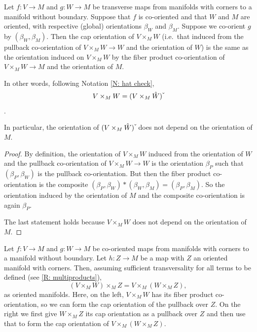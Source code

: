 \begin{lemma}\label{L: same induced}
	Let $f \colon V \to M$ and $g \colon W \to M$ be transverse maps from manifolds with corners to a manifold without boundary.
	Suppose that $f$ is co-oriented and that $W$ and $M$ are oriented, with respective (global) orientations $\beta_W$ and $\beta_M$.
	Suppose we co-orient $g$ by $(\beta_W,\beta_M)$.
	Then the cap orientation of $V \times_M W$ (i.e.\ that induced from the pullback co-orientation of $V \times_M W \to W$ and the orientation of $W$) is the same as the orientation induced on $V \times_M W$ by the fiber product co-orientation of $V \times_M W \to M$ and the orientation of $M$.

	In other words, following Notation \ref{N: hat check},
	\[
	V \times_M W = (V \times_M \hat W)\,\check{\vrule height1.3ex width0pt}
	\].

	In particular, the orientation of $(V \times_M \hat W)\,\check{\vrule height1.3ex width0pt}$ does not depend on the orientation of $M$.
\end{lemma}

\begin{proof}
	By definition, the orientation of $V \times_M W$ induced from the orientation of $W$ and the pullback co-orientation of $V \times_M W \to W$ is the orientation $\beta_P$ such that $(\beta_P,\beta_W)$ is the pullback co-orientation.
	But then the fiber product co-orientation is the composite $(\beta_P,\beta_W)*(\beta_W,\beta_M) = (\beta_P,\beta_M)$.
	So the orientation induced by the orientation of $M$ and the composite co-orientation is again $\beta_P$.

	The last statement holds because $V \times_M W$ does not depend on the orientation of $M$.
\end{proof}

\begin{proposition}\label{P: OC mixed associativity}
	Let $f \colon V \to M$ and $g \colon W \to M$ be co-oriented maps from manifolds with corners to a manifold without boundary.
	Let $h \colon Z \to M$ be a map with $Z$ an oriented manifold with corners.
	Then, assuming sufficient transversality for all terms to be defined (see \cref{R: multiproducts}),
	$$(V \times_M W) \times_M Z = V \times_M (W \times_M Z),$$
	as oriented manifolds.
	Here, on the left, $V \times_M W$ has its fiber product co-orientation, so we can form the cap orientation of the pullback over $Z$.
	On the right we first give $W \times_M Z$ its cap orientation as a pullback over $Z$ and then use that to form the cap orientation of $V \times_M (W \times_M Z)$.
\end{proposition}


